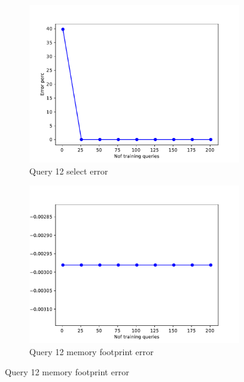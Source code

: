 \begin{figure}[!htb]
   \begin{subfigure}[t]{0.5\textwidth}
     \includegraphics[scale=0.4]{figs/tpch10/tpch10_sel12_error.pdf}
     \caption{Query 12 select error}
     \label{fig:tpch_sel12}
   \end{subfigure}
   \begin{subfigure}[t]{0.5\textwidth}
     \includegraphics[scale=0.4]{figs/tpch10/tpch10_q12_memerror.pdf}
     \caption{Query 12 memory footprint error}
     \label{fig:tpch_mem12}
   \end{subfigure}



\end{figure}
